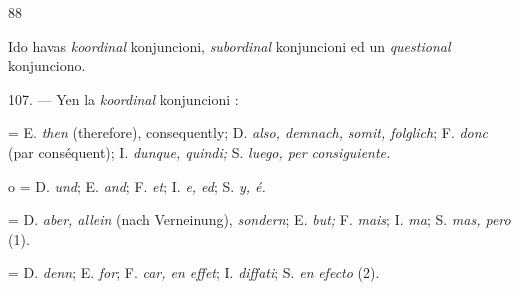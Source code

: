 \begin{VUpage}[92]{88}
\VUsaut{6.23mm}
\VUsaut{4.17mm}

Ido havas \textit{koordinal} konjuncioni, \textit{subordinal} konjuncioni\nl
ed un \textit{questional} konjunciono.

\VUblanc{5.83pt}%
107. --- Yen la \textit{koordinal} konjuncioni :

 = E. \textit{then} (therefore), consequently; D. \textit{also, demnach,}\nl
\textit{somit, folglich}; F. \textit{donc} (par conséquent); I. \textit{dunque, quindi;}\nl
S. \textit{luego, per consiguiente.}

 o  = D. \textit{und}; E. \textit{and}; F. \textit{et}; I. \textit{e, ed}; S. \textit{y, é.}

 = D. \textit{aber, allein} (nach Verneinung), \textit{sondern}; E. \textit{but;}\nl
F. \textit{mais}; I. \textit{ma}; S. \textit{mas, pero} (1).

 = D. \textit{denn}; E. \textit{for}; F. \textit{car, en effet}; I. \textit{diffati}; S. \textit{en}\nl
\textit{efecto} (2).
\end{VUpage}

